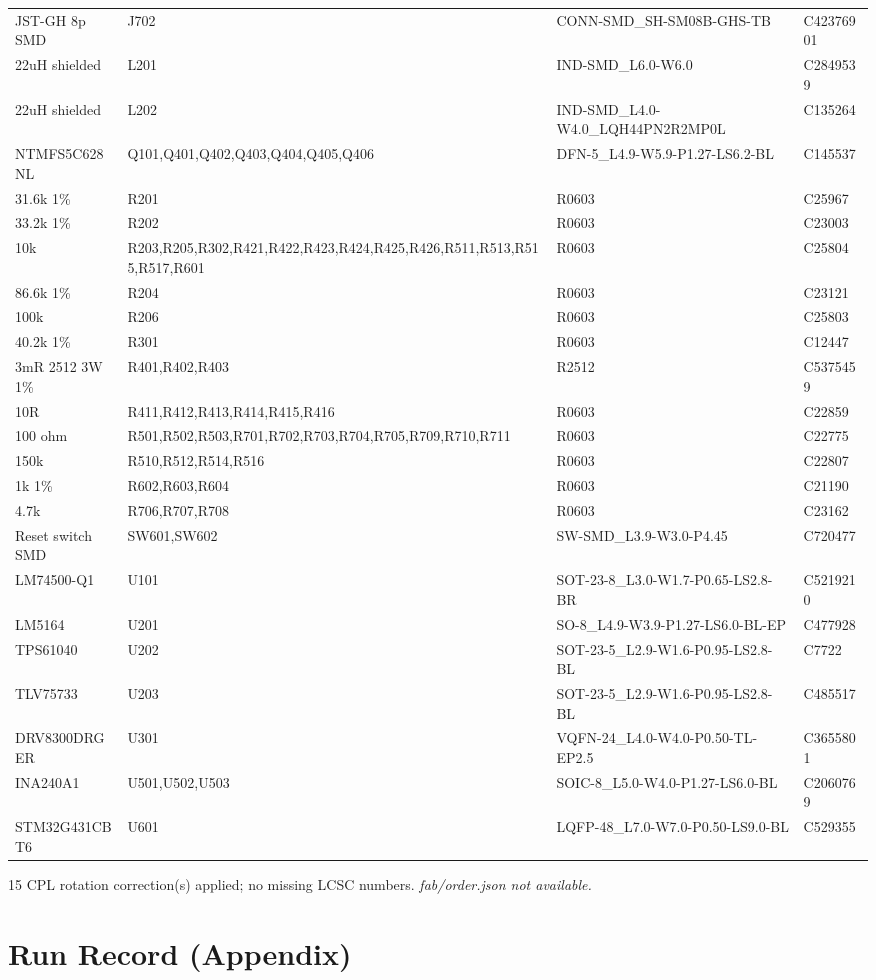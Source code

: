 \documentclass[11pt,a4paper]{article}
\begin{document}
{\begin{longtable}{p{4.4cm}p{2.8cm}p{4.6cm}l}
JST-GH 8p SMD & J702 & CONN-SMD\_SH-SM08B-GHS-TB & C42376901 \\
22uH shielded & L201 & IND-SMD\_L6.0-W6.0 & C2849539 \\
22uH shielded & L202 & IND-SMD\_L4.0-W4.0\_LQH44PN2R2MP0L & C135264 \\
NTMFS5C628NL & Q101,Q401,Q402,Q403,Q404,Q405,Q406 & DFN-5\_L4.9-W5.9-P1.27-LS6.2-BL & C145537 \\
31.6k 1\% & R201 & R0603 & C25967 \\
33.2k 1\% & R202 & R0603 & C23003 \\
10k & R203,R205,R302,R421,R422,R423,R424,R425,R426,R511,R513,R515,R517,R601 & R0603 & C25804 \\
86.6k 1\% & R204 & R0603 & C23121 \\
100k & R206 & R0603 & C25803 \\
40.2k 1\% & R301 & R0603 & C12447 \\
3mR 2512 3W 1\% & R401,R402,R403 & R2512 & C5375459 \\
10R & R411,R412,R413,R414,R415,R416 & R0603 & C22859 \\
100 ohm & R501,R502,R503,R701,R702,R703,R704,R705,R709,R710,R711 & R0603 & C22775 \\
150k & R510,R512,R514,R516 & R0603 & C22807 \\
1k 1\% & R602,R603,R604 & R0603 & C21190 \\
4.7k & R706,R707,R708 & R0603 & C23162 \\
Reset switch SMD & SW601,SW602 & SW-SMD\_L3.9-W3.0-P4.45 & C720477 \\
LM74500-Q1 & U101 & SOT-23-8\_L3.0-W1.7-P0.65-LS2.8-BR & C5219210 \\
LM5164 & U201 & SO-8\_L4.9-W3.9-P1.27-LS6.0-BL-EP & C477928 \\
TPS61040 & U202 & SOT-23-5\_L2.9-W1.6-P0.95-LS2.8-BL & C7722 \\
TLV75733 & U203 & SOT-23-5\_L2.9-W1.6-P0.95-LS2.8-BL & C485517 \\
DRV8300DRGER & U301 & VQFN-24\_L4.0-W4.0-P0.50-TL-EP2.5 & C3655801 \\
INA240A1 & U501,U502,U503 & SOIC-8\_L5.0-W4.0-P1.27-LS6.0-BL & C2060769 \\
STM32G431CBT6 & U601 & LQFP-48\_L7.0-W7.0-P0.50-LS9.0-BL & C529355 \\
\bottomrule
\end{longtable}
}
15 CPL rotation correction(s) applied; no missing LCSC numbers.
\emph{fab/order.json not available.}
\section{Run Record (Appendix)}
\end{document}
